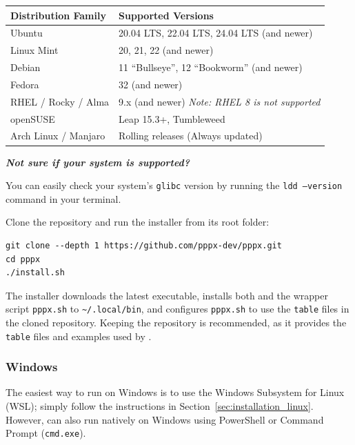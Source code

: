 \begin{table}[h]
\centering
\renewcommand{\arraystretch}{1.25}
\begin{tabular}{p{} p{}}
    \hline
    Distribution Family & Supported Versions \\ 
    \hline
    Ubuntu & 20.04 LTS, 22.04 LTS, 24.04 LTS (and newer) \\ 
    Linux Mint & 20, 21, 22 (and newer) \\ 
    Debian & 11 ``Bullseye'', 12 ``Bookworm'' (and newer) \\ 
    Fedora & 32 (and newer) \\ 
    RHEL / Rocky / Alma & 9.x (and newer) \newline \textit{Note: RHEL 8 is not supported} \\ 
    openSUSE & Leap 15.3+, Tumbleweed \\ 
    Arch Linux / Manjaro & Rolling releases (Always updated) \\ 
    \hline
\end{tabular}
\end{table}

\vspace{1em}
\textit{\textbf{Not sure if your system is supported?}}

You can easily check your system's \texttt{glibc} version
by running the \texttt{ldd --version} command in your terminal.


Clone the repository and run the installer from its root folder:

\begin{verbatim}
git clone --depth 1 https://github.com/pppx-dev/pppx.git
cd pppx
./install.sh
\end{verbatim}

The installer downloads the latest \pppx{} executable, installs both \pppx{} and the
wrapper script \texttt{pppx.sh} to \verb|~/.local/bin|, and configures \texttt{pppx.sh}
to use the \texttt{table} files in the cloned repository. Keeping the repository is
recommended, as it provides the \texttt{table} files and examples used by \pppx{}.



\subsubsection{Windows}
\label{sec:installation_windows}

The easiest way to run \pppx{} on Windows is to use the Windows Subsystem for Linux (WSL);
simply follow the instructions in Section~\ref{sec:installation_linux}.
However, \pppx{} can also run natively on Windows
using PowerShell or Command Prompt (\texttt{cmd.exe}).


